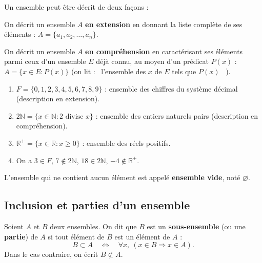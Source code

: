 \documentclass[a4paper,12pt,openany]{book}
\providecommand{\og}{\guillemotleft~}
\providecommand{\fg}{\ifhmode~\fi\guillemotright}
\begin{document}
Un ensemble peut être décrit de deux façons :

\begin{definition}
On décrit un ensemble $A$ \textbf{en extension} en donnant la liste complète
de ses éléments : $A = \{a_1, a_2, \dots, a_n\}$.
\end{definition}

\begin{definition}
On décrit un ensemble $A$ \textbf{en compréhension} en caractérisant ses
éléments parmi ceux d'un ensemble $E$ déjà connu, au moyen d'un prédicat
$P(x)$ : $A = \{x \in E : P(x)\}$ (on lit : \og l'ensemble des $x$ de $E$
tels que $P(x)$ \fg).
\end{definition}

\begin{exemple}
\begin{enumerate}
  \item $F = \{0,1,2,3,4,5,6,7,8,9\}$ : ensemble des chiffres du système
  décimal (description en extension).
  \item $2\mathbb{N} = \{x \in \mathbb{N} : 2 \text{ divise } x\}$ : ensemble
  des entiers naturels pairs (description en compréhension).
  \item $\mathbb{R}^+ = \{x \in \mathbb{R} : x \geq 0\}$ : ensemble des réels
  positifs.
  \item On a $3 \in F$, $7 \notin 2\mathbb{N}$, $18 \in 2\mathbb{N}$,
  $-4 \notin \mathbb{R}^+$.
\end{enumerate}
\end{exemple}

\begin{definition}
L'ensemble qui ne contient aucun élément est appelé \textbf{ensemble vide},
noté $\varnothing$.
\end{definition}

\subsection{Inclusion et parties d'un ensemble}


\begin{definition}[2.5 -- Inclusion]
Soient $A$ et $B$ deux ensembles. On dit que $B$ est un \textbf{sous-ensemble}
(ou une \textbf{partie}) de $A$ si tout élément de $B$ est un élément de $A$ :
\[
B \subset A \quad \Longleftrightarrow \quad \forall x,\ (x \in B \Rightarrow x \in A).
\]
Dans le cas contraire, on écrit $B \not\subset A$.
\end{definition}
\end{document}
